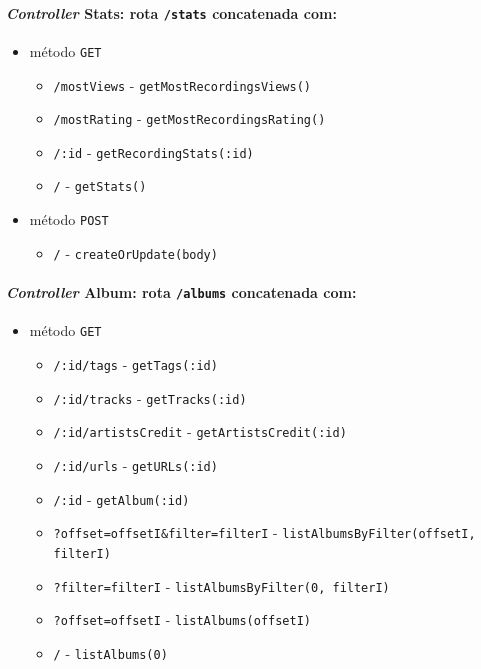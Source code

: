 \documentclass{article}
\begin{document}
\paragraph{\textit{Controller} Stats: rota \texttt{/stats} concatenada com:}
    \begin{itemize}
        \item método \texttt{GET}
            \begin{itemize}
                \item \texttt{/mostViews} - \texttt{getMostRecordingsViews()} 
                \item \texttt{/mostRating} - \texttt{getMostRecordingsRating()} 
                \item \texttt{/:id} - \texttt{getRecordingStats(:id)} 
                \item \texttt{/} - \texttt{getStats()} 
            \end{itemize}
        \item método \texttt{POST}
            \begin{itemize}
                \item \texttt{/} - \texttt{createOrUpdate(body)}
            \end{itemize}
    \end{itemize}

\paragraph{\textit{Controller} Album: rota \texttt{/albums} concatenada com:}
    \begin{itemize}
        \item método \texttt{GET}
            \begin{itemize}
                \item \texttt{/:id/tags} - \texttt{getTags(:id)} 
                \item \texttt{/:id/tracks} - \texttt{getTracks(:id)} 
                \item \texttt{/:id/artistsCredit} - \texttt{getArtistsCredit(:id)} 
                \item \texttt{/:id/urls} - \texttt{getURLs(:id)} 
                \item \texttt{/:id} - \texttt{getAlbum(:id)} 
                \item \texttt{?offset=offsetI\&filter=filterI} - \texttt{listAlbumsByFilter(offsetI, filterI)}
                \item \texttt{?filter=filterI} - \texttt{listAlbumsByFilter(0, filterI)}
                \item \texttt{?offset=offsetI} - \texttt{listAlbums(offsetI)}
                \item \texttt{/} - \texttt{listAlbums(0)}
            \end{itemize}
    \end{itemize}
\end{document}
